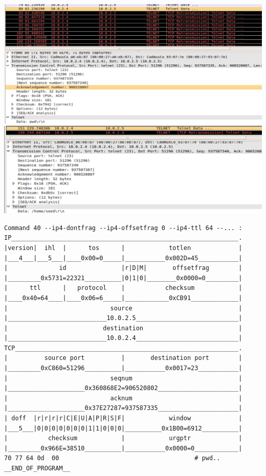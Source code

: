 \documentclass[12pt, a4paper, pdflatex]{article}
\begin{document}
\includegraphics[width=.95\textwidth]{gfx/request.png}\\
\includegraphics[width=.95\textwidth]{gfx/response.png}

\begin{verbatim}
Command 40 --ip4-dontfrag --ip4-offsetfrag 0 --ip4-ttl 64 --... :
IP______________________________________________________________.
|version|  ihl  |      tos      |            totlen             |
|___4___|___5___|____0x00=0_____|___________0x002D=45___________|
|              id               |r|D|M|       offsetfrag        |
|_________0x5731=22321__________|0|1|0|________0x0000=0_________|
|      ttl      |   protocol    |           checksum            |
|____0x40=64____|____0x06=6_____|____________0xCB91_____________|
|                            source                             |
|___________________________10.0.2.5____________________________|
|                          destination                          |
|___________________________10.0.2.4____________________________|
TCP_____________________________________________________________.
|          source port          |       destination port        |
|_________0xC860=51296__________|___________0x0017=23___________|
|                            seqnum                             |
|_____________________0x360868E2=906520802______________________|
|                            acknum                             |
|_____________________0x37E27287=937587335______________________|
| doff  |r|r|r|r|C|E|U|A|P|R|S|F|            window             |
|___5___|0|0|0|0|0|0|0|1|1|0|0|0|__________0x1B00=6912__________|
|           checksum            |            urgptr             |
|_________0x966E=38510__________|___________0x0000=0____________|
70 77 64 0d  00                                     # pwd..
__END_OF_PROGRAM__
\end{verbatim}
\end{document}

